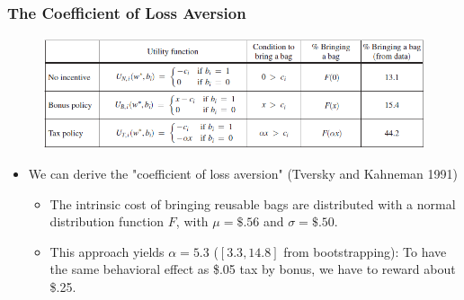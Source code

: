 \documentclass[dvipdfmx,11pt]{beamer}
\begin{document}
\begin{frame}\frametitle{The Coefficient of Loss Aversion}
  \begin{figure}[ht]
    \centering
    \includegraphics[scale = .1]{0807tanji/model_esti}
  \end{figure}

  \begin{itemize}
    \small
    \item We can derive the "coefficient of loss aversion" (Tversky and Kahneman 1991)
    \begin{itemize}
      \footnotesize
      \item The intrinsic cost of bringing reusable bags are distributed with a normal distribution function $F$, with $\mu = \$.56$ and $\sigma = \$.50$.
      \item This approach yields $\alpha = 5.3$ ($[3.3, 14.8]$ from bootstrapping): To have the same behavioral effect as \$.05 tax by bonus, we have to reward about  \$.25.
    \end{itemize}
  \end{itemize}
\end{frame}
\end{document}
